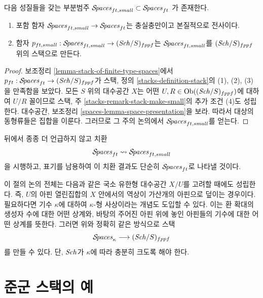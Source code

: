 \begin{lemma}
\label{lemma-stack-ft-spaces}
다음 성질들을 갖는 부분범주
$\mathcal{S}\!\mathit{paces}_{ft, small} \subset \mathcal{S}\!\mathit{paces}_{ft}$
가 존재한다.
\begin{enumerate}
\item 포함 함자 $\mathcal{S}\!\mathit{paces}_{ft, small} \to \mathcal{S}\!\mathit{paces}_{ft}$는
충실충만이고 본질적으로 전사이다.
\item 함자
$p_{ft, small} : \mathcal{S}\!\mathit{paces}_{ft, small} \to (\mathit{Sch}/S)_{fppf}$는
$\mathcal{S}\!\mathit{paces}_{ft, small}$를 $(\mathit{Sch}/S)_{fppf}$ 위의 스택으로 만든다.
\end{enumerate}
\end{lemma}

\begin{proof}
보조정리 \ref{lemma-stack-of-finite-type-spaces}에서
$p_{ft} : \mathcal{S}\!\mathit{paces}_{ft} \to (\mathit{Sch}/S)_{fppf}$가 스택, 정의
\ref{stacks-definition-stack}의 (1), (2), (3)을 만족함을 보았다. 모든
$S$ 위의 대수공간 $X$는 어떤
$U, R \in \mathop{\mathrm{Ob}}\nolimits((\mathit{Sch}/S)_{fppf})$에 대하여 $U/R$ 꼴이므로 스택, 주
\ref{stacks-remark-stack-make-small}의 추가 조건 (4)도 성립한다. 대수공간,
보조정리 \ref{spaces-lemma-space-presentation}을 보라. 따라서 대상의
동형류들은 집합을 이룬다. 그러므로 그 주의 논의에서
$\mathcal{S}\!\mathit{paces}_{ft, small}$를 얻는다.
\end{proof}

\noindent
뒤에서 종종 더 언급하지 않고 치환
$$
\mathcal{S}\!\mathit{paces}_{ft} \leadsto \mathcal{S}\!\mathit{paces}_{ft, small}
$$
을 시행하고, 표기를 남용하여 이 치환 결과도 단순히 $\mathcal{S}\!\mathit{paces}_{ft}$로
나타낼 것이다.

\begin{remark}
\label{remark-higher-cardinality-spaces}
이 절의 논의 전체는 다음과 같은 국소 유한형 대수공간 $X/U$를 고려할
때에도 성립한다. 즉, $U$의 아핀 열린집합의 $X$ 안에서의 역상이 가산개의
아핀으로 덮이는 경우이다. 필요하다면 기수 $\kappa$에 대하여
$\kappa$-형 사상이라는 개념도 도입할 수 있다. 이는 환 확대의 생성자 수에
대한 어떤 상계와, 바탕의 주어진 아핀 위에 놓인 아핀들의 기수에 대한 어떤
상계를 뜻한다. 그러면 위와 정확히 같은 방식으로 스택
$$
\mathcal{S}\!\mathit{paces}_\kappa \longrightarrow (\mathit{Sch}/S)_{fppf}
$$
를 만들 수 있다. 단, $\mathit{Sch}$가 $\kappa$에 따라 충분히 크도록 해야 한다.
\end{remark}





\section{준군 스택의 예}
\label{section-examples-stacks-in-groupoids}

